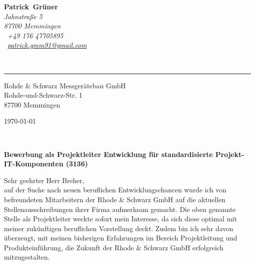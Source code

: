 \documentclass[10pt,a4paper]{article}
\def\firstname{Patrick}
\def\familyname{Grüner}
\begin{document}
\sffamily   %
\hfill%
\begin{minipage}[t]{.6\textwidth}
	\raggedleft%
	{\bfseries {\color{firstnamecolor}\firstname}~{\color{familynamecolor}\familyname}}\\[.35ex]
	\small\itshape%
	Jahnstraße 5\\
	87700 Memmingen\\[.35ex]
	\Mobilefone~+49 176 47705895\\
	\Letter~\href{mailto:patrick.gmm91@gmail.com}{patrick.gmm91@gmail.com}
\end{minipage}\\[0.5em]
%
{\color{firstnamecolor}\rule{\textwidth}{.25ex}}
%
\begin{minipage}[t]{.5\textwidth}
	\raggedright%
	\vspace*{1em}
	Rohde \& Schwarz Messgerätebau GmbH\\[.35ex]
	\small%
	Rohde-und-Schwarz-Str. 1\\
	87700 Memmingen
\end{minipage}
%
\hfill
%
\begin{minipage}[t]{.4\textwidth}
	\raggedleft %
	\today
\end{minipage}\\[1em]
\raggedright

{\bfseries \color{familynamecolor}Bewerbung als Projektleiter Entwicklung für standardisierte Projekt-IT-Komponenten (3136)\\[1.5em]}

Sehr geehrter Herr Breher,\\[1em]
%
auf der Suche nach neuen beruflichen Entwicklungschancen wurde ich von befreundeten Mitarbeitern der Rhode \& Schwarz GmbH auf die aktuellen Stellenausschreibungen ihrer Firma aufmerksam gemacht. Die oben genannte Stelle als Projektleiter weckte sofort mein Interesse, da sich diese optimal mit meiner zukünftigen beruflichen Vorstellung deckt. Zudem bin ich sehr davon überzeugt, mit meinen bisherigen Erfahrungen im Bereich Projektleitung und Produkteinführung, die Zukunft der Rhode \& Schwarz GmbH erfolgreich mitzugestalten.
\end{document}
